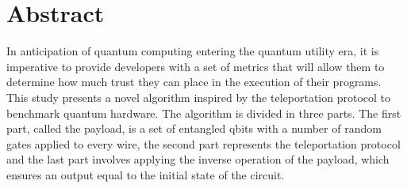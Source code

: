 \section*{Abstract}

In anticipation of quantum computing entering the quantum utility era, it is imperative to provide developers with a set of metrics that will allow them to determine how much trust they can place in the execution of their programs. This study presents a novel algorithm inspired by the teleportation protocol to benchmark quantum hardware. The algorithm is divided in three parts. The first part, called the payload, is a set of entangled qbits with a number of random gates applied to every wire, the second part represents the teleportation protocol and the last part involves applying the inverse operation of the payload, which ensures an output equal to the initial state of the circuit.